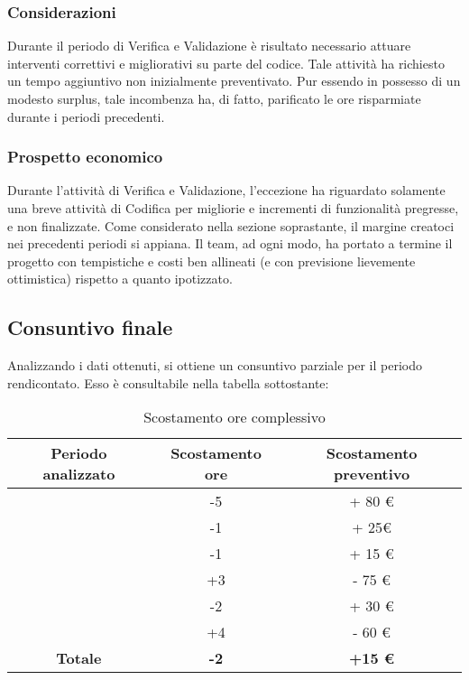 \subsubsection{Considerazioni}
Durante il periodo di Verifica e Validazione è risultato necessario attuare interventi correttivi e migliorativi su parte del codice. Tale attività ha richiesto un tempo aggiuntivo non inizialmente preventivato. Pur essendo in possesso di un modesto surplus, tale incombenza ha, di fatto, parificato le ore risparmiate durante i periodi precedenti.

\subsubsection{Prospetto economico}
Durante l'attività di Verifica e Validazione, l'eccezione ha riguardato solamente una breve attività di Codifica per migliorie e incrementi di funzionalità pregresse, e non finalizzate. Come considerato nella sezione soprastante, il margine creatoci nei precedenti periodi si appiana. Il team, ad ogni modo, ha portato a termine il progetto con tempistiche e costi ben allineati (e con previsione lievemente ottimistica) rispetto a quanto ipotizzato. 

\newpage
\subsection{Consuntivo finale}

Analizzando i dati ottenuti, si ottiene un consuntivo parziale per il periodo rendicontato. Esso è consultabile nella tabella sottostante:

\begin{table}[H]
	\begin{center}
		\begin{tabular}{|c|c|c|}
			\hline
			\textbf{Periodo analizzato}	& \textbf{Scostamento ore}	& \textbf{Scostamento preventivo} \\
			\hline
			\AdR	&	-5	&	+ 80 €	\\
			\hline
			\ARD	&	-1	&	+ 25€	\\
			\hline
			\PA   &		-1  &	+ 15 €	\\
			\hline
			\PD   &	+3  &	- 75 €	\\
			\hline
			\CO   &		-2  &	+ 30 €	\\
			\hline
			\VV   &		+4  &	- 60 €	\\
			\hline
			\textbf{Totale} & \textbf{-2} & \textbf{+15 €} \\
			\hline
		\end{tabular}
	\end{center}
	\caption{Scostamento ore complessivo}
\end{table}

